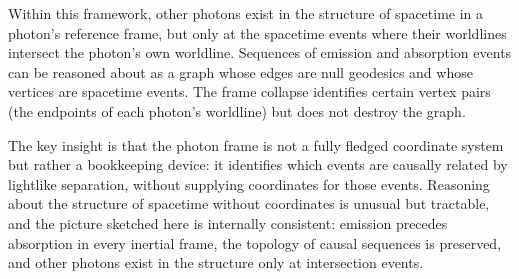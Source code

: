 \documentclass[11pt]{article}
\begin{document}
Within this framework, other photons exist in the structure of spacetime in a photon's reference frame, but only at the spacetime events where their worldlines intersect the photon's own worldline. Sequences of emission and absorption events can be reasoned about as a graph whose edges are null geodesics and whose vertices are spacetime events. The frame collapse identifies certain vertex pairs (the endpoints of each photon's worldline) but does not destroy the graph.

The key insight is that the photon frame is not a fully fledged coordinate system but rather a bookkeeping device: it identifies which events are causally related by lightlike separation, without supplying coordinates for those events. Reasoning about the structure of spacetime without coordinates is unusual but tractable, and the picture sketched here is internally consistent: emission precedes absorption in every inertial frame, the topology of causal sequences is preserved, and other photons exist in the structure only at intersection events.
\end{document}
